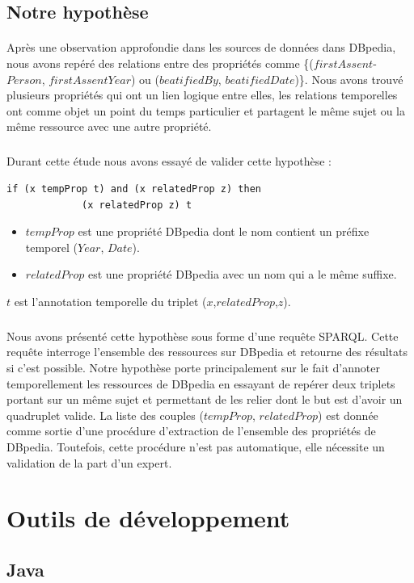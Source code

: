 \subsection{Notre hypothèse}
\paragraph{}
Après une observation approfondie dans les sources de données dans DBpedia, nous avons repéré des relations entre des propriétés comme \{($firstAssent$-
$Person$, $firstAssentYear$) ou ($beatifiedBy$, $beatifiedDate$)\}. Nous avons trouvé plusieurs propriétés qui ont un lien logique entre elles, les relations temporelles ont comme objet un point du temps particulier et partagent le même sujet ou la même ressource avec une autre propriété.
\subparagraph{}
Durant cette étude nous avons essayé de valider cette hypothèse :
\begin{verbatim}
if (x tempProp t) and (x relatedProp z) then
             (x relatedProp z) t 
\end{verbatim}

\begin{itemize}
\item $tempProp$ est une propriété DBpedia dont le nom contient un préfixe temporel ($Year$, $Date$).
\item $relatedProp$ est une propriété DBpedia avec un nom qui a le même suffixe.
\end{itemize}
$t$ est l'annotation temporelle du triplet ($x$,$relatedProp$,$z$).
\subparagraph{}
Nous avons présenté cette hypothèse sous forme d'une requête SPARQL. Cette requête interroge l'ensemble des ressources sur DBpedia et retourne des résultats si c'est possible.
Notre hypothèse porte principalement sur le fait d'annoter temporellement les ressources de DBpedia en essayant de repérer deux triplets portant sur un même sujet et permettant de les relier dont le but est d'avoir un quadruplet valide. La liste des couples ($tempProp$, $relatedProp$)
est donnée comme sortie d'une procédure d'extraction de l'ensemble des propriétés de DBpedia. Toutefois, cette procédure n'est pas automatique, elle nécessite un validation de la part d'un expert.
\section{Outils de développement}
\subsection{ Java}
